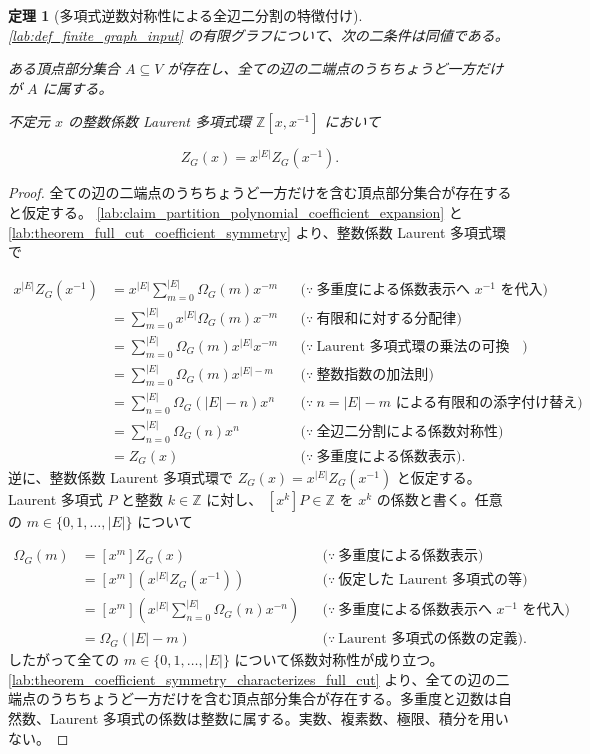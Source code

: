 \documentclass[11pt,a4paper]{article}
\newtheorem{theorem}[definition]{定理}
\theoremstyle{remark}
\begin{document}
\begin{theorem}[多項式逆数対称性による全辺二分割の特徴付け]\label{lab:theorem_partition_polynomial_reciprocity_characterizes_full_cut}
\cref{lab:def_finite_graph_input}
 の有限グラフについて、次の二条件は同値である。

ある頂点部分集合 
$A\subseteq V$
 が存在し、全ての辺の二端点のうちちょうど一方だけが 
$A$
 に属する。

不定元 
$x$
 の整数係数 Laurent 多項式環 
$\mathbb Z[x,x^{-1}]$
 において

\[Z_G(x)=x^{|E|}Z_G(x^{-1}).\]
\end{theorem}
\begin{proof}
全ての辺の二端点のうちちょうど一方だけを含む頂点部分集合が存在すると仮定する。
\cref{lab:claim_partition_polynomial_coefficient_expansion}
 と 
\cref{lab:theorem_full_cut_coefficient_symmetry}
 より、整数係数 Laurent 多項式環で

\[\begin{aligned}
x^{|E|}Z_G(x^{-1})
&=x^{|E|}\sum_{m=0}^{|E|}\Omega_G(m)x^{-m}
&&\bigl(\because\ \text{多重度による係数表示へ }x^{-1}\text{ を代入}\bigr)\\
&=\sum_{m=0}^{|E|}x^{|E|}\Omega_G(m)x^{-m}
&&\bigl(\because\ \text{有限和に対する分配律}\bigr)\\
&=\sum_{m=0}^{|E|}\Omega_G(m)x^{|E|}x^{-m}
&&\bigl(\because\ \text{Laurent 多項式環の乗法の可換律}\bigr)\\
&=\sum_{m=0}^{|E|}\Omega_G(m)x^{|E|-m}
&&\bigl(\because\ \text{整数指数の加法則}\bigr)\\
&=\sum_{n=0}^{|E|}\Omega_G(|E|-n)x^n
&&\bigl(\because\ n=|E|-m\text{ による有限和の添字付け替え}\bigr)\\
&=\sum_{n=0}^{|E|}\Omega_G(n)x^n
&&\bigl(\because\ \text{全辺二分割による係数対称性}\bigr)\\
&=Z_G(x)
&&\bigl(\because\ \text{多重度による係数表示}\bigr).
\end{aligned}\]
逆に、整数係数 Laurent 多項式環で 
$Z_G(x)=x^{|E|}Z_G(x^{-1})$
 と仮定する。Laurent 多項式 
$P$
 と整数 
$k\in\mathbb Z$
 に対し、
$[x^k]P\in\mathbb Z$
 を 
$x^k$
 の係数と書く。任意の 
$m\in\{0,1,\ldots,|E|\}$
 について

\[\begin{aligned}
\Omega_G(m)
&=[x^m]Z_G(x)
&&\bigl(\because\ \text{多重度による係数表示}\bigr)\\
&=[x^m]\!\left(x^{|E|}Z_G(x^{-1})\right)
&&\bigl(\because\ \text{仮定した Laurent 多項式の等式}\bigr)\\
&=[x^m]\!\left(x^{|E|}\sum_{n=0}^{|E|}\Omega_G(n)x^{-n}\right)
&&\bigl(\because\ \text{多重度による係数表示へ }x^{-1}\text{ を代入}\bigr)\\
&=\Omega_G(|E|-m)
&&\bigl(\because\ \text{Laurent 多項式の係数の定義}\bigr).
\end{aligned}\]
したがって全ての 
$m\in\{0,1,\ldots,|E|\}$
 について係数対称性が成り立つ。
\cref{lab:theorem_coefficient_symmetry_characterizes_full_cut}
 より、全ての辺の二端点のうちちょうど一方だけを含む頂点部分集合が存在する。多重度と辺数は自然数、Laurent 多項式の係数は整数に属する。実数、複素数、極限、積分を用いない。

\end{proof}
\end{document}
